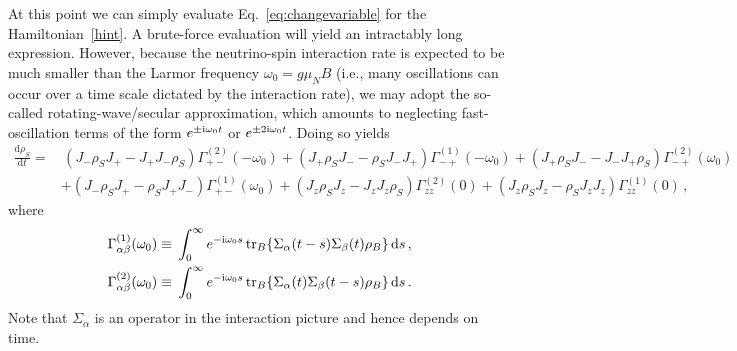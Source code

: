 \documentclass[aps,prd,10pt,twocolumn,superscriptaddress,floatfix,nofootinbib,amsmath,amssymb,altaffilletter,preprintnumbers]{revtex4-1}
\begin{document}
At this point we can simply evaluate Eq.~\eqref{eq:changevariable} for the Hamiltonian~\eqref{hint}.  A brute-force evaluation will yield an intractably long expression.  However, because the neutrino-spin interaction rate is expected to be much smaller than the Larmor frequency $\omega_0=g\mu_{N}B$ (i.e., many oscillations can occur over 
a time scale dictated by the interaction rate), we may adopt the so-called rotating-wave/secular approximation, which amounts to neglecting fast-oscillation terms of the form $e^{\pm {\rm i}\omega_0t}$ or $e^{\pm 2{\rm i}\omega_0t}$. Doing so yields 
\begin{equation}
\begin{aligned}
\frac{\mathrm{d} \rho_S}{\mathrm{d}t}  = &\,  (J_- \rho_S J_+ -J_+ J_- \rho_S ) \Gamma_{+-}^{(2)}(-\omega_0) 
 + (J_+ \rho_S J_- - \rho_S J_- J_+) \Gamma_{-+}^{(1)}(-\omega_0) 
 + (J_+ \rho_S J_- - J_- J_+ \rho_S) \Gamma_{-+}^{(2)}(\omega_0)  \\
& + (J_- \rho_S J_+ - \rho_S J_+ J_-) \Gamma_{+-}^{(1)}(\omega_0) 
 + (J_z \rho_S J_z - J_z J_z \rho_S) \Gamma_{zz}^{(2)}(0) 
 + (J_z \rho_S J_z - \rho_S J_z J_z) \Gamma_{zz}^{(1)}(0)\, ,
\label{lind}
\end{aligned}
\end{equation}
where 
\begin{equation}
\begin{aligned}
\Gamma_{\alpha \beta}^{(1)}(\omega_0)\equiv &\; \int_0^\infty e^{-{\rm i}\omega_0 s} \,\text{tr}_B\{\Sigma_\alpha(t-s)\Sigma_\beta(t)\rho_B\}\, {\rm d}s\, , \\
\Gamma_{\alpha \beta}^{(2)}(\omega_0)\equiv &\; \int_0^\infty e^{-{\rm i}\omega_0 s} \,\text{tr}_B\{\Sigma_\alpha(t)\Sigma_\beta(t-s)\rho_B\}\, {\rm d} s\, .
\end{aligned}
\end{equation}
Note that $\Sigma_\alpha$ is an operator in the interaction picture and hence depends on time.
\end{document}
